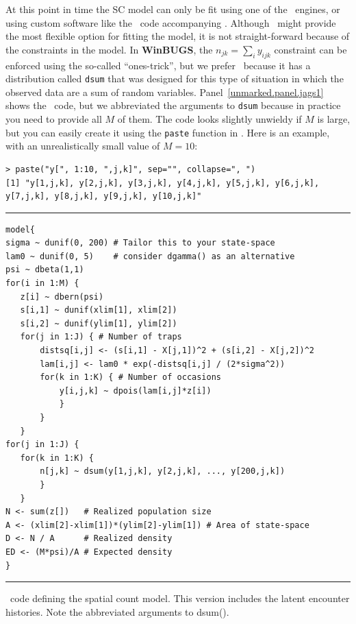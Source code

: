 At this point in time the SC model can only be fit using one of the
\bugs~engines, or using custom software like the \R~code accompanying
\citet{chandler_royle:2012}. Although \bugs~might provide the most
flexible option for fitting the model, it is not
straight-forward because of the
constraints in the model. In \textbf{WinBUGS}, the
$n_{jk} = \sum_i y_{ijk}$
constraint can be
enforced using the so-called ``ones-trick'', but we prefer
\jags~because it has a distribution
called \verb+dsum+ that was designed for this type
of situation in which the observed data are a sum of random
variables. %
Panel~\ref{unmarked.panel.jags1} shows the \jags~code, but
we abbreviated the
arguments to \verb+dsum+ because in practice you need to provide all $M$ of
them. The code looks slightly unwieldy if $M$ is large, but you can easily create
it using the \verb+paste+ function in \R. Here is an example, with an
unrealistically small value of $M=10$:
\begin{small}
\begin{verbatim}
> paste("y[", 1:10, ",j,k]", sep="", collapse=", ")
[1] "y[1,j,k], y[2,j,k], y[3,j,k], y[4,j,k], y[5,j,k], y[6,j,k],
y[7,j,k], y[8,j,k], y[9,j,k], y[10,j,k]"
\end{verbatim}
\end{small}


\begin{panel}[ht]
\centering
\rule[0.05in]{\textwidth}{.03in}
\begin{small}
\begin{verbatim}
model{
sigma ~ dunif(0, 200) # Tailor this to your state-space
lam0 ~ dunif(0, 5)    # consider dgamma() as an alternative
psi ~ dbeta(1,1)
for(i in 1:M) {
   z[i] ~ dbern(psi)
   s[i,1] ~ dunif(xlim[1], xlim[2])
   s[i,2] ~ dunif(ylim[1], ylim[2])
   for(j in 1:J) { # Number of traps
       distsq[i,j] <- (s[i,1] - X[j,1])^2 + (s[i,2] - X[j,2])^2
       lam[i,j] <- lam0 * exp(-distsq[i,j] / (2*sigma^2))
       for(k in 1:K) { # Number of occasions
           y[i,j,k] ~ dpois(lam[i,j]*z[i])
           }
       }
   }
for(j in 1:J) {
   for(k in 1:K) {
       n[j,k] ~ dsum(y[1,j,k], y[2,j,k], ..., y[200,j,k])
       }
   }
N <- sum(z[])   # Realized population size
A <- (xlim[2]-xlim[1])*(ylim[2]-ylim[1]) # Area of state-space
D <- N / A      # Realized density
ED <- (M*psi)/A # Expected density
}
\end{verbatim}
\end{small}
\rule[0.15in]{\textwidth}{.03in}
\caption{\jags~code defining the spatial count model. This version
  includes the latent encounter histories. Note the abbreviated
  arguments to dsum().}
\label{unmarked.panel.jags1}
\end{panel}

